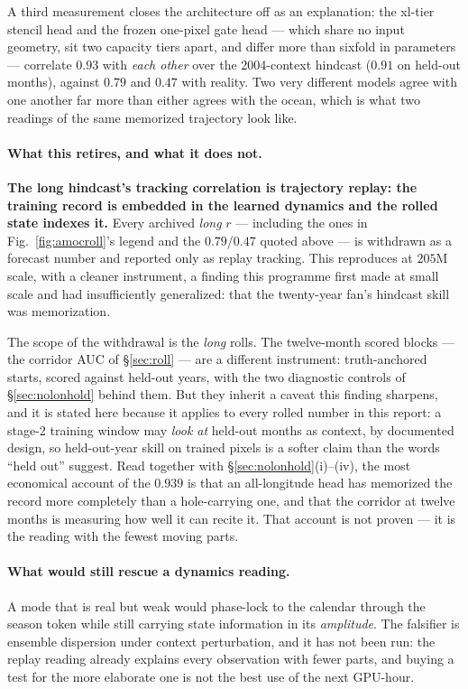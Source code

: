 \documentclass[10pt]{article}
\begin{document}
A third measurement closes the architecture off as an explanation: the
xl-tier stencil head and the frozen one-pixel gate head --- which share no
input geometry, sit two capacity tiers apart, and differ more than sixfold
in parameters --- correlate $0.93$ with
\emph{each other} over the 2004-context hindcast ($0.91$ on held-out
months), against $0.79$ and $0.47$ with reality. Two very different models
agree with one another far more than either agrees with the ocean, which is
what two readings of the same memorized trajectory look like.

\paragraph{What this retires, and what it does not.} \textbf{The long
hindcast's tracking correlation is trajectory replay: the training record is
embedded in the learned dynamics and the rolled state indexes it.} Every
archived \emph{long} $r$ --- including the ones in Fig.~\ref{fig:amocroll}'s
legend and the $0.79$/$0.47$ quoted above --- is withdrawn as a forecast
number and reported only as replay tracking. This reproduces at $205$M scale,
with a cleaner instrument, a finding this programme first made at small
scale and had insufficiently generalized: that the twenty-year fan's
hindcast skill was memorization.

The scope of the withdrawal is the \emph{long} rolls. The twelve-month
scored blocks --- the corridor AUC of \S\ref{sec:roll} --- are a different
instrument: truth-anchored starts, scored against held-out years, with the
two diagnostic controls of \S\ref{sec:nolonhold} behind them. But they
inherit a caveat this finding sharpens, and it is stated here because it
applies to every rolled number in this report: a stage-2 training window may
\emph{look at} held-out months as context, by documented design, so
held-out-year skill on trained pixels is a softer claim than the words
``held out'' suggest. Read together with \S\ref{sec:nolonhold}(i)--(iv), the
most economical account of the $0.939$ is that an all-longitude head has
memorized the record more completely than a hole-carrying one, and that the
corridor at twelve months is measuring how well it can recite it. That
account is not proven --- it is the reading with the fewest moving parts.

\paragraph{What would still rescue a dynamics reading.} A mode that is real
but weak would phase-lock to the calendar through the season token while
still carrying state information in its \emph{amplitude}. The falsifier is
ensemble dispersion under context perturbation, and it has not been run: the
replay reading already explains every observation with fewer parts, and
buying a test for the more elaborate one is not the best use of the next
GPU-hour.
\end{document}
